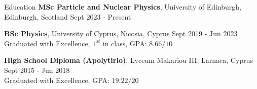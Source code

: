 \documentclass{resume} %
\begin{document}
        \begin{rSection}{Education}
                {\bf MSc Particle and Nuclear Physics}, University of Edinburgh, Edinburgh, Scotland \hfill {Sept 2023 - Present}
                
                {\bf BSc Physics}, University of Cyprus, Nicosia, Cyprus \hfill {Sept 2019 - Jun 2023}\\
                Graduated with Excellence, $1^{st}$ in class, GPA: $8.66/10$
                
                {\bf High School Diploma (Apolytirio)}, Lyceum Makariou III, Larnaca, Cyprus \hfill {Sept 2015 - Jun 2018}\\
        Graduated with Excellence, GPA: $19.22/20$
        \end{rSection}

        \bigbreak
\end{document}
